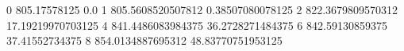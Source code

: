 0 805.17578125 0.0
1 805.5608520507812 0.38507080078125
2 822.3679809570312 17.19219970703125
4 841.4486083984375 36.2728271484375
6 842.59130859375 37.41552734375
8 854.0134887695312 48.83770751953125
